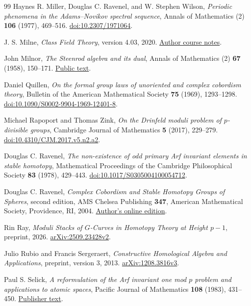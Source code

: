 \begin{thebibliography}{99}
Haynes R. Miller, Douglas C. Ravenel, and W. Stephen Wilson,
\emph{Periodic phenomena in the Adams--Novikov spectral sequence},
Annals of Mathematics (2) \textbf{106} (1977), 469--516.
\href{https://doi.org/10.2307/1971064}{doi:10.2307/1971064}.

J. S. Milne,
\emph{Class Field Theory}, version 4.03, 2020.
\href{https://www.jmilne.org/math/CourseNotes/CFT.pdf}{Author course notes}.

John Milnor,
\emph{The Steenrod algebra and its dual},
Annals of Mathematics (2) \textbf{67} (1958), 150--171.
\href{https://www.sas.rochester.edu/mth/sites/doug-ravenel/otherpapers/Milnor-A.pdf}{Public text}.

Daniel Quillen,
\emph{On the formal group laws of unoriented and complex cobordism theory},
Bulletin of the American Mathematical Society \textbf{75} (1969), 1293--1298.
\href{https://doi.org/10.1090/S0002-9904-1969-12401-8}{doi:10.1090/S0002-9904-1969-12401-8}.

Michael Rapoport and Thomas Zink,
\emph{On the Drinfeld moduli problem of $p$-divisible groups},
Cambridge Journal of Mathematics \textbf{5} (2017), 229--279.
\href{https://doi.org/10.4310/CJM.2017.v5.n2.a2}{doi:10.4310/CJM.2017.v5.n2.a2}.

Douglas C. Ravenel,
\emph{The non-existence of odd primary Arf invariant elements
in stable homotopy},
Mathematical Proceedings of the Cambridge Philosophical Society
\textbf{83} (1978), 429--443.
\href{https://doi.org/10.1017/S0305004100054712}{doi:10.1017/S0305004100054712}.

Douglas C. Ravenel,
\emph{Complex Cobordism and Stable Homotopy Groups of Spheres},
second edition, AMS Chelsea Publishing \textbf{347},
American Mathematical Society, Providence, RI, 2004.
\href{https://www.sas.rochester.edu/mth/sites/doug-ravenel/mybooks/ravenel.pdf}{Author's online edition}.

Rin Ray,
\emph{Moduli Stacks of $G$-Curves in Homotopy Theory at Height $p-1$},
preprint, 2026.
\href{https://arxiv.org/abs/2509.23428v2}{arXiv:2509.23428v2}.

Julio Rubio and Francis Sergeraert,
\emph{Constructive Homological Algebra and Applications},
preprint, version 3, 2013.
\href{https://arxiv.org/abs/1208.3816v3}{arXiv:1208.3816v3}.

Paul S. Selick,
\emph{A reformulation of the Arf invariant one mod $p$ problem
and applications to atomic spaces},
Pacific Journal of Mathematics \textbf{108} (1983), 431--450.
\href{https://msp.org/pjm/1983/108-2/pjm-v108-n2-p12-s.pdf}{Publisher text}.


\end{thebibliography}
